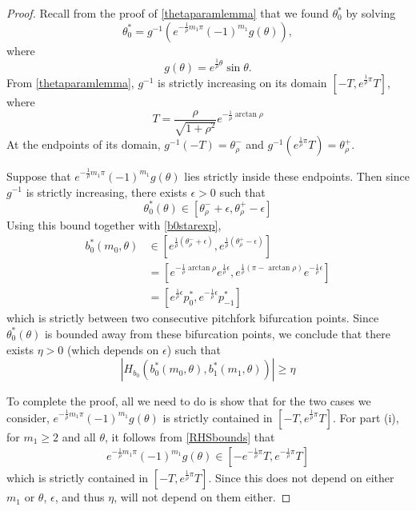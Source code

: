 \documentclass[thesis.tex]{subfiles}
\begin{document}
\begin{lemma}
\begin{proof}
Recall from the proof of \cref{thetaparamlemma} that we found $\theta_0^*$ by solving
\begin{equation*}
\theta_0^* = g^{-1}\left( e^{ -\frac{1}{\rho} m_1 \pi } (-1)^{m_1} g(\theta) \right),
\end{equation*}
where 
\[
g(\theta) = e^{ \frac{1}{\rho} \theta } \sin \theta.
\]
From \cref{thetaparamlemma}, $g^{-1}$ is strictly increasing on its domain $[-T,e^{\frac{1}{\rho}\pi}T]$, where
\begin{equation*}
T = \frac{\rho}{\sqrt{1+\rho^2}}e^{-\frac{1}{\rho}\arctan \rho}
\end{equation*}
At the endpoints of its domain, $g^{-1}(-T) = \theta_\rho^-$ and $g^{-1}(e^{\frac{1}{\rho}\pi}T) = \theta_\rho^+$. 

Suppose that $e^{-\frac{1}{\rho} m_1 \pi } (-1)^{m_1} g(\theta)$ lies strictly inside these endpoints. Then since $g^{-1}$ is strictly increasing, there exists $\epsilon > 0$ such that
\begin{equation}\label{thetastarboundeps}
\theta_0^*(\theta) \in [\theta_\rho^- + \epsilon, \theta_\rho^+ - \epsilon]
\end{equation}
Using this bound together with \eqref{b0starexp},
\begin{align*}
b_0^*(m_0, \theta) 
&\in \left[e^{\frac{1}{\rho}(\theta_\rho^- + \epsilon) }, e^{\frac{1}{\rho}(\theta_\rho^+ - \epsilon) }\right] \\
&= \left[ e^{-\frac{1}{\rho} \arctan \rho} e^{\frac{1}{\rho}\epsilon}, e^{\frac{1}{\rho} (\pi - \arctan \rho)} e^{-\frac{1}{\rho} \epsilon}\right] \\
&= \left[ e^{\frac{1}{\rho}\epsilon} p_0^*, e^{-\frac{1}{\rho} \epsilon} p_{-1}^* \right]
\end{align*}
which is strictly between two consecutive pitchfork bifurcation points. Since $\theta_0^*(\theta)$ is bounded away from these bifurcation points, we conclude that there exists $\eta > 0$ (which depends on $\epsilon$) such that
\[
|H_{b_0} (b_0^*(m_0, \theta), b_1^*(m_1, \theta))| \geq \eta
\]

To complete the proof, all we need to do is show that for the two cases we consider, $e^{-\frac{1}{\rho} m_1 \pi } (-1)^{m_1} g(\theta)$ is strictly contained in $[-T,e^{\frac{1}{\rho}\pi}T]$. For part (i), for $m_1 \geq 2$ and all $\theta$, it follows from \eqref{RHSbounds} that
\begin{align}\label{RHSboundgeq2}
e^{ -\frac{1}{\rho} m_1 \pi } (-1)^{m_1} g(\theta) \in [-e^{ -\frac{1}{\rho} \pi } T, e^{ -\frac{1}{\rho} \pi } T]
\end{align}
which is strictly contained in $[-T,e^{\frac{1}{\rho}\pi}T]$. Since this does not depend on either $m_1$ or $\theta$, $\epsilon$, and thus $\eta$, will not depend on them either.


\end{proof}
\end{lemma}
\end{document}
